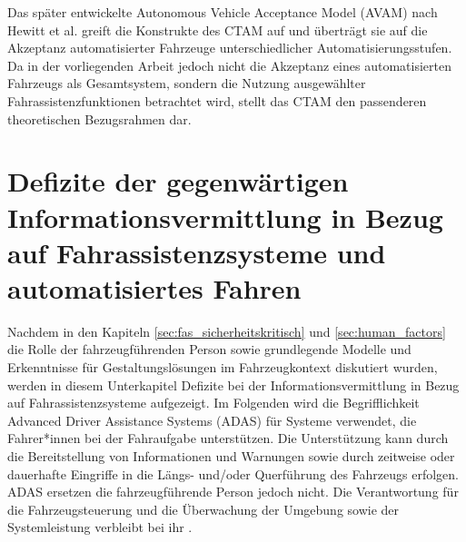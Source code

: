 Das später entwickelte Autonomous Vehicle Acceptance Model (AVAM)
nach Hewitt et al. \cite{hewitt2019assessing} greift die Konstrukte
des CTAM \cite{osswald2012predicting} auf und überträgt sie auf die Akzeptanz automatisierter Fahrzeuge unterschiedlicher Automatisierungsstufen. Da in der
vorliegenden Arbeit jedoch nicht die Akzeptanz eines automatisierten
Fahrzeugs als Gesamtsystem, sondern die Nutzung ausgewählter
Fahrassistenzfunktionen betrachtet wird, stellt das CTAM den
passenderen theoretischen Bezugsrahmen dar.

\section{Defizite der gegenwärtigen Informationsvermittlung in Bezug auf Fahrassistenzsysteme und automatisiertes Fahren}
\label{sec:informationsdefizite}

Nachdem in den Kapiteln \ref{sec:fas_sicherheitskritisch} und \ref{sec:human_factors} die Rolle der fahrzeugführenden Person sowie grundlegende Modelle und Erkenntnisse für Gestaltungslösungen im Fahrzeugkontext diskutiert wurden, werden in diesem Unterkapitel Defizite bei der Informationsvermittlung in Bezug auf Fahrassistenzsysteme aufgezeigt. Im Folgenden wird die Begrifflichkeit Advanced Driver Assistance Systems (ADAS) für Systeme verwendet, die Fahrer*innen bei der Fahraufgabe unterstützen. Die Unterstützung kann durch die Bereitstellung von Informationen und Warnungen sowie durch zeitweise oder dauerhafte Eingriffe in die Längs- und/oder Querführung des Fahrzeugs erfolgen. ADAS ersetzen
die fahrzeugführende Person jedoch nicht. Die Verantwortung für die
Fahrzeugsteuerung und die Überwachung der Umgebung sowie der
Systemleistung verbleibt bei ihr \cite{UNECE2024ADAS}.

